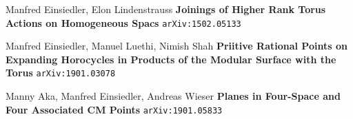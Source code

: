 \documentclass[12pt]{article}
\begin{document}
\begin{thebibliography}{}

\item Manfred Einsiedler, Elon Lindenstrauss \textbf{Joinings of Higher Rank Torus Actions on Homogeneous Spacs} \texttt{arXiv:1502.05133}
\item Manfred Einsiedler, Manuel Luethi, Nimish Shah \textbf{Priitive Rational Points on Expanding Horocycles in Products of the Modular Surface with the Torus} \texttt{arXiv:1901.03078} 
\item Manny Aka, Manfred Einsiedler, Andreas Wieser \textbf{Planes in Four-Space and Four Associated CM Points} \texttt{arXiv:1901.05833}
\end{thebibliography}
\end{document}
